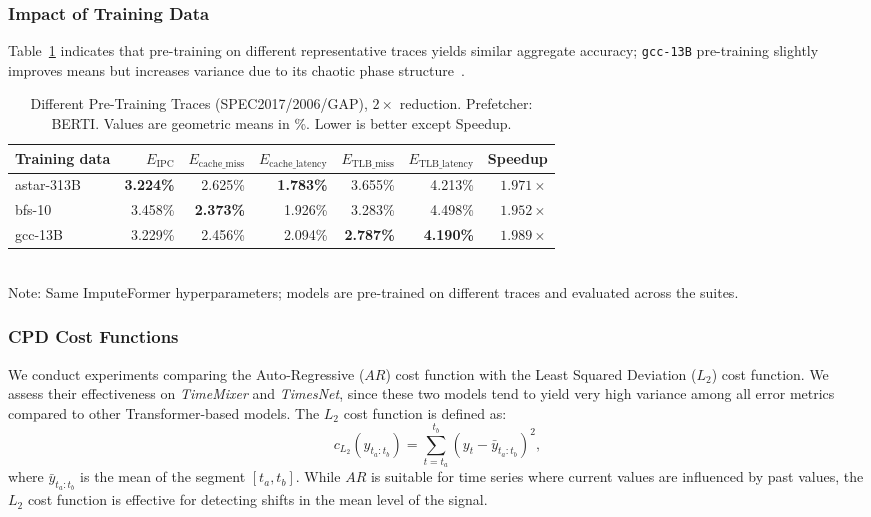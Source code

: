 \subsubsection*{Impact of Training Data}
Table~\ref{tab:sensitivity_training_onecol} indicates that pre-training on different representative traces yields similar aggregate accuracy; \texttt{gcc-13B} pre-training slightly improves means but increases variance due to its chaotic phase structure~\cite{Shen+:ASPLOS04}. %


\begin{table}[htbp!]
  \caption{Different Pre-Training Traces (SPEC2017/2006/GAP), $2\times$ reduction. Prefetcher: BERTI. Values are geometric means in \%. Lower is better except Speedup.}
  \label{tab:sensitivity_training_onecol}
  \centering
  \setlength{\tabcolsep}{2pt}
  \begin{adjustbox}{max width=1.0\columnwidth}
  \begin{tabular}{l|rrrrrr}
  \toprule
  Training data & ${E}_{\text{IPC}}$  & $E_{\text{cache\_miss}}$  &$E_{\text{cache\_latency}}$  & $E_{\text{TLB\_miss}}$    & $E_{\text{TLB\_latency}}$   & Speedup \\
  \midrule
  astar-313B & \textbf{3.224\%} & 2.625\% & \textbf{1.783\%} & 3.655\% & 4.213\% & $1.971\times$ \\
  bfs-10     & 3.458\% & \textbf{2.373\%} & 1.926\% & 3.283\% & 4.498\% & $1.952\times$ \\
  gcc-13B    & 3.229\% & 2.456\% & 2.094\% & \textbf{2.787\%} & \textbf{4.190\%} & \textbf{$1.989\times$} \\
  \bottomrule
  \end{tabular}
  \end{adjustbox}
  \vspace{0.25ex}
  \\
  \footnotesize Note: Same ImputeFormer hyperparameters; models are pre-trained on different traces and evaluated across the suites.
\end{table}


\subsubsection*{CPD Cost Functions}
We conduct experiments comparing the {Auto-Regressive ($AR$)} cost function with the {Least Squared Deviation ($L_2$)} cost function. We assess their effectiveness on \textit{TimeMixer} and \textit{TimesNet}, since these two models tend to yield very high variance among all error metrics compared to other Transformer-based models. The $L_2$ cost function is defined as: $$c_{\text{$L_2$}}(y_{t_a:t_b}) = \sum_{t = t_a}^{t_b} \left( y_t - \bar{y}_{t_a:t_b} \right)^2,$$
where $\bar{y}_{t_a:t_b}$ is the mean of the segment $[t_a, t_b]$. 
While $AR$ is suitable for time series where current values are influenced by past values, the $L_2$ cost function is effective for detecting shifts in the mean level of the signal\cite{Lavielle2005}.   

